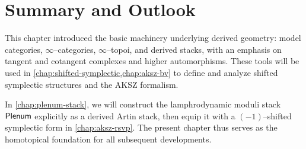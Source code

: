 \section{Summary and Outlook}

This chapter introduced the basic machinery underlying derived geometry:
model categories, $\infty$--categories, $\infty$--topoi, and derived stacks,
with an emphasis on tangent and cotangent complexes and higher automorphisms.
These tools will be used in \cref{chap:shifted-symplectic,chap:aksz-bv} to
define and analyze shifted symplectic structures and the AKSZ formalism.

In \cref{chap:plenum-stack}, we will construct the lamphrodynamic moduli
stack $\mathsf{Plenum}$ explicitly as a derived Artin stack, then equip it with a
$(-1)$--shifted symplectic form in
\cref{chap:aksz-rsvp}. The present chapter thus serves as the homotopical
foundation for all subsequent developments.


